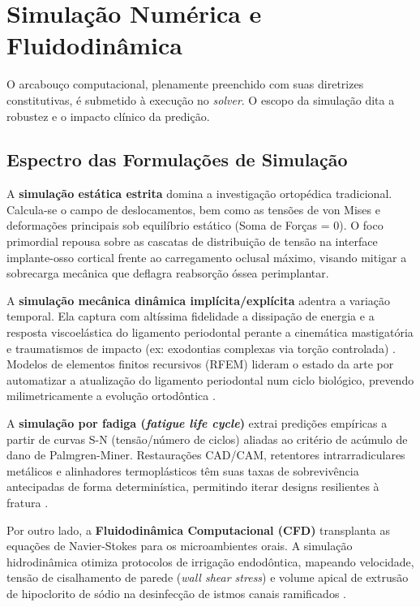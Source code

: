 \section{Simulação Numérica e Fluidodinâmica}
\label{sec:simulacao}

O arcabouço computacional, plenamente preenchido com suas diretrizes constitutivas, é submetido à execução no \textit{solver}. O escopo da simulação dita a robustez e o impacto clínico da predição.

\subsection{Espectro das Formulações de Simulação}
\label{subsec:tipos-simulacao}

A \textbf{simulação estática estrita} domina a investigação ortopédica tradicional. Calcula-se o campo de deslocamentos, bem como as tensões de von Mises e deformações principais sob equilíbrio estático (Soma de Forças = 0). O foco primordial repousa sobre as cascatas de distribuição de tensão na interface implante-osso cortical frente ao carregamento oclusal máximo, visando mitigar a sobrecarga mecânica que deflagra reabsorção óssea perimplantar.

A \textbf{simulação mecânica dinâmica implícita/explícita} adentra a variação temporal. Ela captura com altíssima fidelidade a dissipação de energia e a resposta viscoelástica do ligamento periodontal perante a cinemática mastigatória e traumatismos de impacto (ex: exodontias complexas via torção controlada) \cite{xing2024clinical}. Modelos de elementos finitos recursivos (RFEM) lideram o estado da arte por automatizar a atualização do ligamento periodontal num ciclo biológico, prevendo milimetricamente a evolução ortodôntica \cite{zhang2024recursive}.

A \textbf{simulação por fadiga (\textit{fatigue life cycle})} extrai predições empíricas a partir de curvas S-N (tensão/número de ciclos) aliadas ao critério de acúmulo de dano de Palmgren-Miner. Restaurações CAD/CAM, retentores intrarradiculares metálicos e alinhadores termoplásticos têm suas taxas de sobrevivência antecipadas de forma determinística, permitindo iterar designs resilientes à fratura \cite{liu2024fatigue}.

Por outro lado, a \textbf{Fluidodinâmica Computacional (CFD)} transplanta as equações de Navier-Stokes para os microambientes orais. A simulação hidrodinâmica otimiza protocolos de irrigação endodôntica, mapeando velocidade, tensão de cisalhamento de parede (\textit{wall shear stress}) e volume apical de extrusão de hipoclorito de sódio na desinfecção de istmos canais ramificados \cite{elsaid2025digital}.

